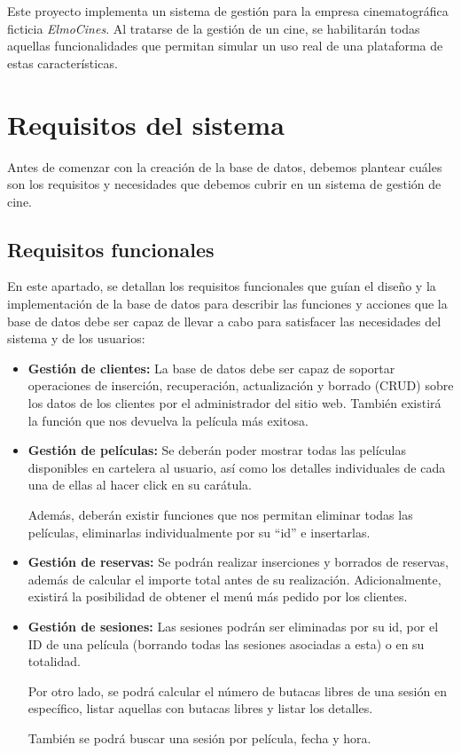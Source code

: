 Este proyecto implementa un sistema de gestión para la empresa cinematográfica ficticia \textit{ElmoCines}. Al tratarse de la gestión de un cine, se habilitarán todas aquellas funcionalidades que permitan simular un uso real de una plataforma de estas características.

\section{Requisitos del sistema}
Antes de comenzar con la creación de la base de datos, debemos plantear cuáles son los requisitos y necesidades que debemos cubrir en un sistema de gestión de cine.
\subsection{Requisitos funcionales}
En este apartado, se detallan los requisitos funcionales que guían el diseño y la implementación de la base de datos para describir las funciones y acciones que la base de datos debe ser capaz de llevar a cabo para satisfacer las necesidades del sistema y de los usuarios:

\begin{itemize}
    \item \textbf{Gestión de clientes:} La base de datos debe ser capaz de soportar operaciones de inserción, recuperación, actualización y borrado (CRUD) sobre los datos de los clientes por el administrador del sitio web. También existirá la función que nos devuelva la película más exitosa.

    \item \textbf{Gestión de películas:} Se deberán poder mostrar todas las películas disponibles en cartelera al usuario, así como los detalles individuales de cada una de ellas al hacer click en su carátula.

    Además, deberán existir funciones que nos permitan eliminar todas las películas, eliminarlas individualmente por su ``id'' e insertarlas.

    \item \textbf{Gestión de reservas:} Se podrán realizar inserciones y borrados de reservas, además de calcular el importe total antes de su realización. Adicionalmente, existirá la posibilidad de obtener el menú más pedido por los clientes.

    \item \textbf{Gestión de sesiones:} Las sesiones podrán ser eliminadas por su id, por el ID de una película (borrando todas las sesiones asociadas a esta) o en su totalidad.

    Por otro lado, se podrá calcular el número de butacas libres de una sesión en específico, listar aquellas con butacas libres y listar los detalles.

    También se podrá buscar una sesión por película, fecha y hora.
\end{itemize}

